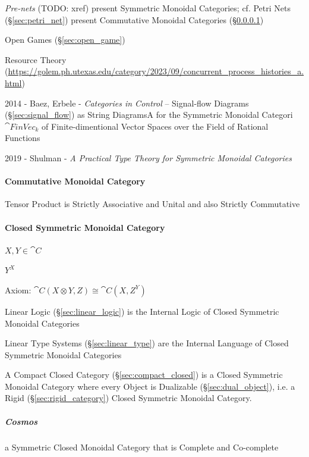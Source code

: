 \emph{Pre-nets} (TODO: xref) present Symmetric Monoidal Categories; cf. Petri
Nets (\S\ref{sec:petri_net}) present Commutative Monoidal Categories
(\S\ref{sec:commutative_monoidal})

Open Games (\S\ref{sec:open_game})

Resource Theory
(\url{https://golem.ph.utexas.edu/category/2023/09/concurrent_process_histories_a.html})

2014 - Baez, Erbele - \emph{Categories in Control} -- Signal-flow Diagrams
(\S\ref{sec:signal_flow}) as String DiagramsA for the Symmetric Monoidal
Categori $\cat{FinVec}_k$ of Finite-dimentional Vector Spaces over the Field of
Rational Functions

2019 - Shulman -
\emph{A Practical Type Theory for Symmetric Monoidal Categories}



\paragraph{Commutative Monoidal Category}\label{sec:commutative_monoidal}\hfill

Tensor Product is Strictly Associative and Unital and also Strictly Commutative



\paragraph{Closed Symmetric Monoidal Category}\hfill
\label{sec:closed_symmetric_monoidal}

$X, Y \in \cat{C}$

$Y^X$

Axiom: $\cat{C}(X \otimes Y, Z) \cong \cat{C}(X, Z^Y)$

Linear Logic (\S\ref{sec:linear_logic}) is the Internal Logic of
Closed Symmetric Monoidal Categories

Linear Type Systems (\S\ref{sec:linear_type}) are the Internal
Language of Closed Symmetric Monoidal Categories

A Compact Closed Category (\S\ref{sec:compact_closed}) is a Closed
Symmetric Monoidal Category where every Object is Dualizable
(\S\ref{sec:dual_object}), i.e. a Rigid (\S\ref{sec:rigid_category})
Closed Symmetric Monoidal Category.



\subparagraph{Cosmos}\label{sec:cosmos}\hfill

a Symmetric Closed Monoidal Category that is Complete and Co-complete



